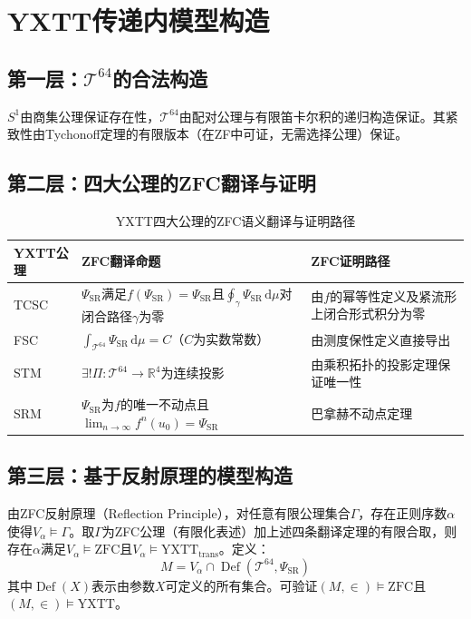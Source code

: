 \documentclass[12pt,a4paper]{article}
\newcommand{\ud}{\ensuremath{\,\mathrm{d}}}
\newcommand{\vModels}{\vDash}
\theoremstyle{plain}
\theoremstyle{definition}
\newcommand{\Tsixtyfour}{\mathcal{T}^{64}}
\newcommand{\R}{\mathbb{R}}
\newcommand{\PSR}{\Psi_{\mathrm{SR}}}
\newcommand{\YXTT}{\mathrm{YXTT}}
\newcommand{\ZFC}{\mathrm{ZFC}}
\DeclareMathOperator{\Def}{Def}
\begin{document}
\section{YXTT传递内模型构造}
\label{sec:construction}
 
\subsection{第一层：$\Tsixtyfour$的合法构造}
$S^1$由商集公理保证存在性，$\Tsixtyfour$由配对公理与有限笛卡尔积的递归构造保证。其紧致性由Tychonoff定理的有限版本（在ZF中可证，无需选择公理）保证。
 
\subsection{第二层：四大公理的ZFC翻译与证明}
\begin{table}[H]
\centering
\caption{YXTT四大公理的ZFC语义翻译与证明路径}
\label{tab:axioms_zfc}
\begin{tabular}{@{}p{2.5cm}p{6.0cm}p{6.5cm}@{}}
\toprule
\textbf{YXTT公理} & \textbf{ZFC翻译命题} & \textbf{ZFC证明路径} \\
\midrule
TCSC & $\PSR$满足$f(\PSR)=\PSR$且$\oint_\gamma \PSR\ud\mu$对闭合路径$\gamma$为零 & 由$f$的幂等性定义及紧流形上闭合形式积分为零 \\
FSC & $\int_{\Tsixtyfour}\PSR\ud\mu = C$（$C$为实数常数） & 由测度保性定义直接导出 \\
STM & $\exists! \Pi:\Tsixtyfour\to\R^4$为连续投影 & 由乘积拓扑的投影定理保证唯一性 \\
SRM & $\PSR$为$f$的唯一不动点且$\lim_{n\to\infty}f^n(u_0)=\PSR$ & 巴拿赫不动点定理 \\
\bottomrule
\end{tabular}
\end{table}
 
\subsection{第三层：基于反射原理的模型构造}
由ZFC反射原理（Reflection Principle）\cite{kunen2011}，对任意有限公理集合$\Gamma$，存在正则序数$\alpha$使得$V_\alpha\vDash\Gamma$。取$\Gamma$为ZFC公理（有限化表述）加上述四条翻译定理的有限合取，则存在$\alpha$满足$V_\alpha\vDash\ZFC$且$V_\alpha\vDash\YXTT_{\text{trans}}$。定义：
\[
M = V_\alpha \cap \Def(\Tsixtyfour,\PSR)
\]
其中$\Def(X)$表示由参数$X$可定义的所有集合。可验证$(M,\in)\vDash\ZFC$且$(M,\in)\vModels\YXTT$。
 
\end{document}
